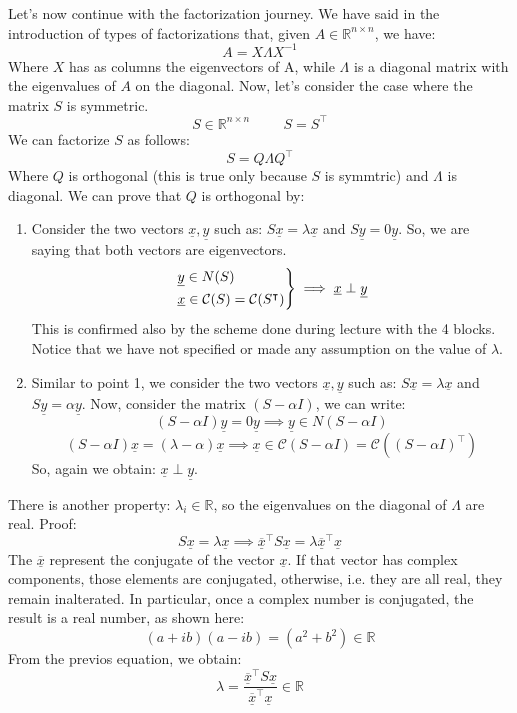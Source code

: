 Let's now continue with the factorization journey. We have said in the introduction of types of factorizations that, given $A \in \mathbb{R}^{n\times n}$, we have:
\[
    A = X \Lambda X^{-1}
\]
Where $X$ has as columns the eigenvectors of A, while $\Lambda$ is a diagonal matrix with the eigenvalues of $A$ on the diagonal. Now, let's consider the case where the matrix $S$ is symmetric.
\[
    S \in \mathbb{R}^{n\times n} \hspace{1cm} S = S^\intercal
\]
We can factorize $S$ as follows:
\[
    S = Q \Lambda Q^\intercal
\]
Where $Q$ is orthogonal (this is true only because $S$ is symmtric) and $\Lambda$ is diagonal.
We can prove that $Q$ is orthogonal by:
\begin{enumerate}
    \item Consider the two vectors $\underline{x}, \underline{y}$ such as: $S\underline{x} = \lambda\underline{x}$ and $S\underline{y} = 0\underline{y}$. So, we are saying that both vectors are eigenvectors.
    \[
        \begin{rcases}
            \underline{y} \in N(S)\\
            \underline{x} \in \mathcal{C}(S) = \mathcal{C}(S^{\intercal})    
        \end{rcases}
        \implies \underline{x} \perp \underline{y}
    \]
    This is confirmed also by the scheme done during lecture with the 4 blocks. Notice that we have not specified or made any assumption on the value of $\lambda$.
    \item Similar to point 1, we consider the two vectors $\underline{x}, \underline{y}$ such as: $S\underline{x} = \lambda\underline{x}$ and $S\underline{y} = \alpha\underline{y}$. Now, consider the matrix $(S - \alpha I)$, we can write:
    \[
        (S - \alpha I)\underline{y} = 0\underline{y} \implies \underline{y} \in N(S - \alpha I)
    \]
    \[
        (S - \alpha I)\underline{x} = (\lambda - \alpha)\underline{x} \implies \underline{x} \in \mathcal{C}(S - \alpha I) = \mathcal{C}((S - \alpha I)^{\intercal})
    \]
    So, again we obtain: $\underline{x} \perp \underline{y}$.
\end{enumerate}
There is another property: $\lambda_i \in \mathbb{R}$, so the eigenvalues on the diagonal of $\Lambda$ are real. Proof:
\[
    S\underline{x} = \lambda\underline{x} \implies \overline{\underline{x}}^\intercal S\underline{x} = \lambda\overline{\underline{x}}^\intercal\underline{x}     
\]
The $\overline{\underline{x}}$ represent the conjugate of the vector $\underline{x}$. If that vector has complex components, those elements are conjugated, otherwise, i.e. they are all real, they remain inalterated. In particular, once a complex number is conjugated, the result is a real number, as shown here:
\[
    (a + ib)(a - ib) = (a^2 + b^2) \in \mathbb{R}    
\]
From the previos equation, we obtain:
\[
    \lambda = \frac{\overline{\underline{x}}^\intercal S\underline{x}}{\overline{\underline{x}}^\intercal\underline{x}} \in \mathbb{R}
\]

